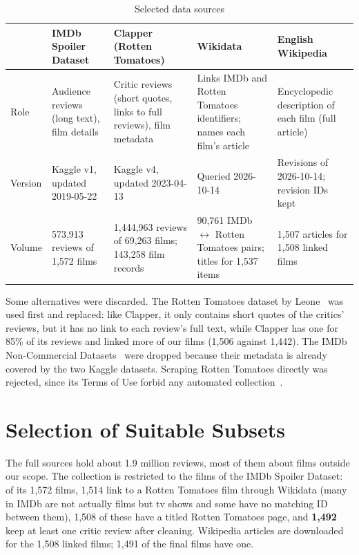 \begin{table}[t]
  \centering
  \caption{Selected data sources}
  \label{tab:sources}
  \small
  \begin{tabularx}{\textwidth}{lXXXX}
    \toprule
    & \textbf{IMDb Spoiler Dataset} & \textbf{Clapper (Rotten Tomatoes)} & \textbf{Wikidata} & \textbf{English Wikipedia} \\
    \midrule
    Role & Audience reviews (long text), film details & Critic reviews (short quotes, links to full reviews), film metadata & Links IMDb and Rotten Tomatoes identifiers; names each film's article & Encyclopedic description of each film (full article) \\
    Version & Kaggle v1, updated 2019-05-22 & Kaggle v4, updated 2023-04-13 & Queried 2026-10-14 & Revisions of 2026-10-14; revision IDs kept \\
    Volume & 573,913 reviews of 1,572 films & 1,444,963 reviews of 69,263 films; 143,258 film records & 90,761 IMDb $\leftrightarrow$ Rotten Tomatoes pairs; titles for 1,537 items & 1,507 articles for 1,508 linked films \\
    \bottomrule
  \end{tabularx}
\end{table}

Some alternatives were discarded. The Rotten Tomatoes dataset by Leone~\cite{leone2020} was used first and replaced: like Clapper, it only contains short quotes of the critics' reviews, but it has no link to each review's full text, while Clapper has one for 85\% of its reviews and linked more of our films (1,506 against 1,442). The IMDb Non-Commercial Datasets~\cite{imdbnc} were dropped because their metadata is already covered by the two Kaggle datasets. Scraping Rotten Tomatoes directly was rejected, since its Terms of Use forbid any automated collection~\cite{rttos}.

\section{Selection of Suitable Subsets}
\label{sec:subsets}
The full sources hold about 1.9 million reviews, most of them about films outside our scope. The collection is restricted to the films of the IMDb Spoiler Dataset: of its 1,572 films, 1,514 link to a Rotten Tomatoes film through Wikidata (many in IMDb are not actually films but tv shows and some have no matching ID between them), 1,508 of these have a titled Rotten Tomatoes page, and \textbf{1,492} keep at least one critic review after cleaning. Wikipedia articles are downloaded for the 1,508 linked films; 1,491 of the final films have one.

